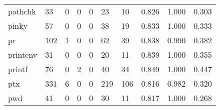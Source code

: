 \begin{longtable}{lp{2.0cm}p{2.0cm}p{2.0cm}p{2.0cm}p{2.0cm}p{2.0cm}p{2.0cm}p{2.0cm}p{2.0cm}}
pathchk   &                     33 &                                             0 &                                            0 &                                           0 &                                           23 &                                         10 &                                0.826 &                                  1.000 &                                0.303 \\
pinky     &                     57 &                                             0 &                                            0 &                                           0 &                                           38 &                                         19 &                                0.833 &                                  1.000 &                                0.333 \\
pr        &                    102 &                                             1 &                                            0 &                                           0 &                                           62 &                                         39 &                                0.838 &                                  0.990 &                                0.382 \\
printenv  &                     31 &                                             0 &                                            0 &                                           0 &                                           20 &                                         11 &                                0.839 &                                  1.000 &                                0.355 \\
printf    &                     76 &                                             0 &                                            2 &                                           0 &                                           40 &                                         34 &                                0.849 &                                  1.000 &                                0.447 \\
ptx       &                    331 &                                             6 &                                            0 &                                           0 &                                          219 &                                        106 &                                0.816 &                                  0.982 &                                0.320 \\
pwd       &                     41 &                                             0 &                                            0 &                                           0 &                                           30 &                                         11 &                                0.817 &                                  1.000 &                                0.268 \\

\end{longtable}
